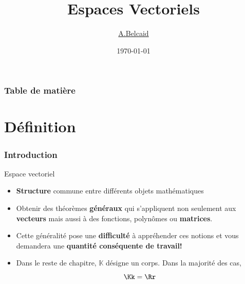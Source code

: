 \documentclass[dvipsnames]{beamer}
\title{Espaces Vectoriels}
\author{\underline{A.Belcaid}}
\institute{\small Université Euro Méditerranéenne de Fès}
\date{\today}
\begin{document}
\maketitle

\begin{frame}[t]
  \frametitle{Table de matière}
 \tableofcontents 
\end{frame}
\section{Définition}%
\label{sec:définition}
\begin{frame}[t]
  \frametitle{Introduction}
  
  \begin{block}{Espace vectoriel}
    \small
    \begin{itemize}
      \item \textbf{\alert{Structure}} commune entre différents objets
        mathématiques\\[10pt]
      \item Obtenir des théorèmes \textbf{généraux}  qui
        s'appliquent non seulement aux \textbf{vecteurs}  mais
        aussi à des fonctions, polynômes ou
        \textbf{matrices}.\\[10pt]
      \item Cette généralité pose une \textbf{difficulté} à
        appréhender ces notions et vous demandera une
        \textbf{\alert{quantité conséquente de travail!}}
    \end{itemize} 
  \end{block}

  \begin{itemize}
    \item Dans le reste de chapitre, $\mathbb{K}$ désigne un corps. Dans la majorité des cas, $$\Kk = \Rr$$ 
  \end{itemize}
\end{frame}
\end{document}
